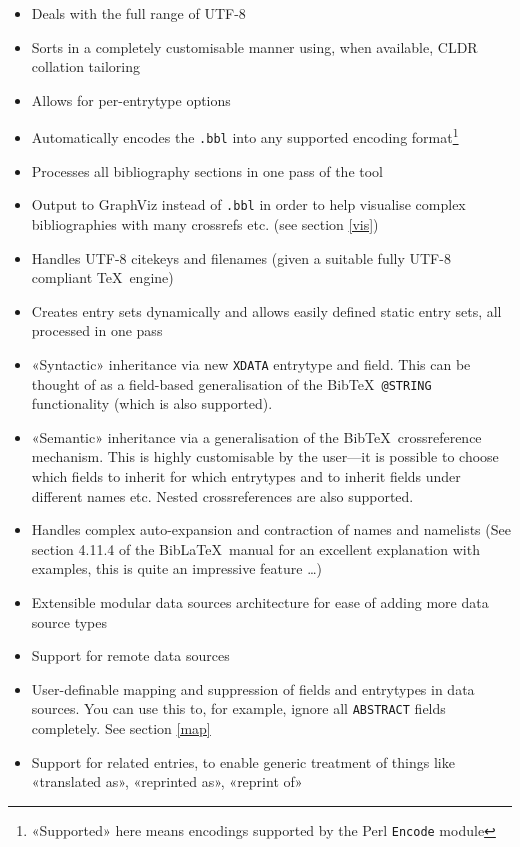 \documentclass{ltxdockit}
\begin{document}
\begin{itemize}
\item Deals with the full range of UTF-8
\item Sorts in a completely customisable manner using, when available,
  CLDR collation tailoring
\item Allows for per-entrytype options
\item Automatically encodes the \verb+.bbl+ into any supported encoding
  format\footnote{«Supported» here means encodings supported by the
    Perl \texttt{Encode} module}
\item Processes all bibliography sections in one pass of the tool
\item Output to GraphViz instead of \verb+.bbl+ in order to help visualise
  complex bibliographies with many crossrefs etc. (see section \ref{vis})
\item Handles UTF-8 citekeys and filenames (given a suitable fully
  UTF-8 compliant \TeX\ engine)
\item Creates entry sets dynamically and allows easily defined static entry sets,
  all processed in one pass
\item «Syntactic» inheritance via new \verb+XDATA+ entrytype and
  field. This can be thought of as a field-based generalisation of the
  Bib\TeX\ \verb+@STRING+ functionality (which is also supported).
\item «Semantic» inheritance via a generalisation of the Bib\TeX\
  crossreference mechanism. This is highly customisable by the
  user---it is possible to choose which fields to inherit for which
  entrytypes and to inherit fields under different names etc. Nested
  crossreferences are also supported.
\item Handles complex auto-expansion and contraction of names and
  namelists (See section 4.11.4 of the Bib\LaTeX\ manual for an excellent
  explanation with examples, this is quite an impressive feature \ldots)
\item Extensible modular data sources architecture for ease of adding
  more data source types
\item Support for remote data sources
\item User-definable mapping and suppression of fields and entrytypes in
  data sources. You can use this to, for example, ignore all
  \verb+ABSTRACT+ fields completely. See section \ref{map}
\item Support for related entries, to enable generic treatment of things
  like «translated as», «reprinted as», «reprint of»

\end{itemize}
\end{document}
